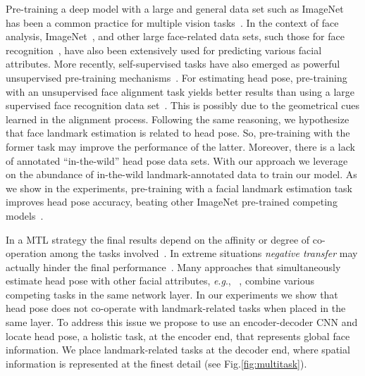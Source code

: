 \documentclass[9pt,technote,compsoc]{IEEEtran}
\newcommand{\eg}{\textit{e}.\textit{g}., }
\begin{document}
Pre-training a deep model with a large and general data set such as ImageNet has been a common practice for multiple vision tasks~\cite{Razavian14}. 
In the context of face analysis, ImageNet~\cite{Amador17,Ruiz18,Hsu18,Ranjan19,Liu19b,Zhang20}, and other large face-related data sets, such those for face recognition~\cite{Liu15, Zhong16,Ranjan17,Cao18b}, have also been extensively used for predicting various facial attributes.
More recently, self-supervised tasks have also emerged as powerful unsupervised pre-training mechanisms~\cite{Wiles18b,Zhang18e,Thewlis19,Jeon19}. For estimating head pose, pre-training with an unsupervised face alignment task yields better results than using a large supervised face recognition data set~\cite{Wiles18b}. This is possibly due to the geometrical cues learned in the alignment process. 
Following the same reasoning, we hypothesize that face landmark estimation is related to head pose. So, pre-training with the former task may improve the performance of the latter. Moreover, there is a lack of annotated ``in-the-wild'' head pose data sets. With our approach we leverage on the abundance of in-the-wild landmark-annotated data to train our model. As we show in the experiments, pre-training with a facial landmark estimation task improves head pose accuracy, beating other  ImageNet pre-trained competing models~\cite{Amador17,Ruiz18,Hsu18,Liu19b}.

In a MTL strategy the final results depend on the affinity or degree of co-operation among the tasks involved~\cite{Zamir18,Standley19}. In extreme situations \emph{negative transfer} may actually hinder the final performance~\cite{Wang19,Lee16}. 
Many approaches that simultaneously estimate head pose with other facial attributes, \eg~\cite{Kumar18b,Ranjan17,Ranjan19}, combine various competing tasks in the same network layer. In our experiments we show that head pose does not co-operate with landmark-related tasks when placed in the same layer.  To address this issue we propose to use  an  encoder-decoder  CNN  and  locate  head pose,  a holistic task, at the encoder end, that represents global face information. We place landmark-related tasks
at the decoder end, where spatial information is represented at the finest detail (see Fig.\ref{fig:multitask}). 
\end{document}
